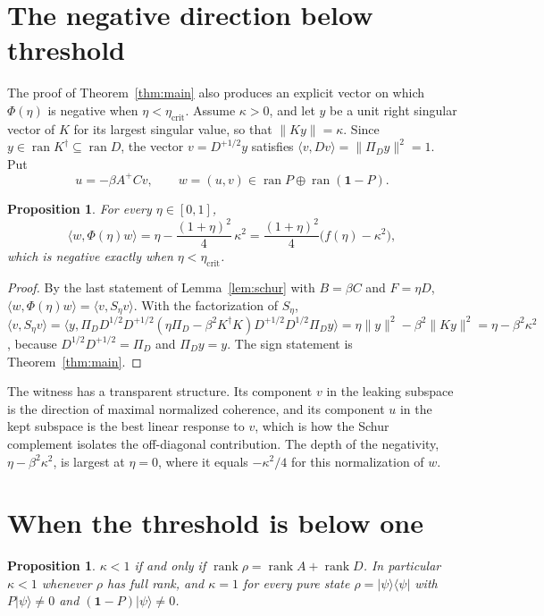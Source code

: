 \documentclass[11pt,a4paper]{article}
\newtheorem{proposition}[theorem]{Proposition}
\theoremstyle{definition}
\theoremstyle{plain}
\DeclareMathOperator{\ran}{ran}
\DeclareMathOperator{\rank}{rank}
\newcommand{\ket}[1]{\lvert#1\rangle}
\newcommand{\bra}[1]{\langle#1\rvert}
\newcommand{\norm}[1]{\lVert#1\rVert}
\newcommand{\one}{\mathbf{1}}
\newcommand{\etac}{\eta_{\mathrm{crit}}}
\begin{document}
\section{The negative direction below threshold}\label{sec:negative}
The proof of Theorem~\ref{thm:main} also produces an explicit vector on which
$\Phi(\eta)$ is negative when $\eta<\etac$. Assume $\kappa>0$, and let $y$ be a
unit right singular vector of $K$ for its largest singular value, so that
$\norm{Ky}=\kappa$. Since $y\in\ran K^\dagger\subseteq\ran D$, the vector
$v=D^{+1/2}y$ satisfies $\langle v,Dv\rangle=\norm{\Pi_Dy}^2=1$. Put
\[
u=-\beta A^+Cv,\qquad w=(u,v)\in\ran P\oplus\ran(\one-P).
\]

\begin{proposition}\label{prop:witness}
For every $\eta\in[0,1]$,
\[
\langle w,\Phi(\eta)w\rangle=\eta-\frac{(1+\eta)^2}{4}\,\kappa^2
=\frac{(1+\eta)^2}{4}\bigl(f(\eta)-\kappa^2\bigr),
\]
which is negative exactly when $\eta<\etac$.
\end{proposition}

\begin{proof}
By the last statement of Lemma~\ref{lem:schur} with $B=\beta C$ and $F=\eta D$,
$\langle w,\Phi(\eta)w\rangle=\langle v,S_\eta v\rangle$. With the
factorization of $S_\eta$,
$\langle v,S_\eta v\rangle=\langle y,\Pi_DD^{1/2}D^{+1/2}(\eta\Pi_D-\beta^2K^\dagger K)D^{+1/2}D^{1/2}\Pi_Dy\rangle
=\eta\norm{y}^2-\beta^2\norm{Ky}^2=\eta-\beta^2\kappa^2$, because
$D^{1/2}D^{+1/2}=\Pi_D$ and $\Pi_Dy=y$. The sign statement is
Theorem~\ref{thm:main}.
\end{proof}

The witness has a transparent structure. Its component $v$ in the leaking
subspace is the direction of maximal normalized coherence, and its component
$u$ in the kept subspace is the best linear response to $v$, which is how the
Schur complement isolates the off-diagonal contribution. The depth of the
negativity, $\eta-\beta^2\kappa^2$, is largest at $\eta=0$, where it equals
$-\kappa^2/4$ for this normalization of $w$.

\section{When the threshold is below one}\label{sec:rank}
\begin{proposition}\label{prop:rank}
$\kappa<1$ if and only if $\rank\rho=\rank A+\rank D$. In particular $\kappa<1$
whenever $\rho$ has full rank, and $\kappa=1$ for every pure state
$\rho=\ket\psi\bra\psi$ with $P\ket\psi\ne0$ and $(\one-P)\ket\psi\ne0$.
\end{proposition}
\end{document}

